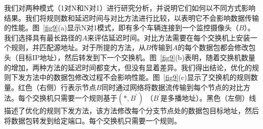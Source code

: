 我们对两种模式（1对N和N对1）进行研究分析，并说明它们如何以不同方式影响结果。我们将规则数和延迟时间与对比方法进行比较，以表明它不会影响数据传输的性能。图~\ref{fig9}(a)显示N对1模式，即有多个车辆连接到一个监控摄像头（$B$）。我们选择具有最长路径的$A$来评估延迟时间。对比方法需要在每个交换机上安装一个规则，并匹配源地址。对于所提的方法，从$B$传输到$A$的每个数据包都会修改包头（目标IP地址），然后转发到下一个交换机。图~\ref{fig9}(b)表明，随着交换机数量的增加，两种方法的延迟时间都变大，但没有显着差异。我们得出结论，优化的规则下发方法中的数据包修改过程不会影响性能。图~\ref{fig9}(c)显示了交换机的规则数量。红色（右侧）行表示节点$B$同时通过网络将数据流传输到每个节点的对比方法。每个交换机只需要一个规则基于$(*, B^{'})$ （$B^{'}$是多播地址）。黑色（左侧）线描述了优化的规则下发方法，该方法修改每个分支节点处的数据包目标地址，然后将数据包转发到给定端口。每个交换机只需要一个规则。



